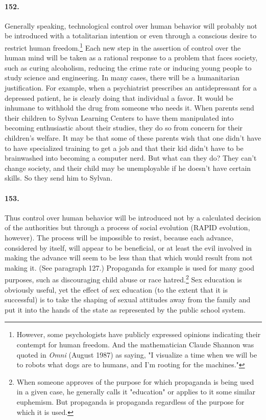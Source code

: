 \documentclass[12pt]{book}
\begin{document}
\paragraph{152.} Generally speaking, technological control over human behavior will probably not be introduced with a totalitarian intention or even through a conscious desire to restrict human freedom.\footnote{However, some psychologists have publicly expressed opinions indicating their contempt for human freedom. And the mathematician Claude Shannon was quoted in \emph{Omni} (August 1987) as saying, "I visualize a time when we will be to robots what dogs are to humans, and I'm rooting for the machines."} Each new step in the assertion of control over the human mind will be taken as a rational response to a problem that faces society, such as curing alcoholism, reducing the crime rate or inducing young people to study science and engineering. In many cases, there will be a humanitarian justification. For example, when a psychiatrist prescribes an antidepressant for a depressed patient, he is clearly doing that individual a favor. It would be inhumane to withhold the drug from someone who needs it. When parents send their children to Sylvan Learning Centers to have them manipulated into becoming enthusiastic about their studies, they do so from concern for their children's welfare. It may be that some of these parents wish that one didn't have to have specialized training to get a job and that their kid didn't have to be brainwashed into becoming a computer nerd. But what can they do? They can't change society, and their child may be unemployable if he doesn't have certain skills. So they send him to Sylvan.


\paragraph{153.} Thus control over human behavior will be introduced not by a calculated decision of the authorities but through a process of social evolution (RAPID evolution, however). The process will be impossible to resist, because each advance, considered by itself, will appear to be beneficial, or at least the evil involved in making the advance will seem to be less than that which would result from not making it. (See paragraph 127.) Propaganda for example is used for many good purposes, such as discouraging child abuse or race hatred.\footnote{When someone approves of the purpose for which propaganda is being used in a given case, he generally calls it "education" or applies to it some similar euphemism. But propaganda is propaganda regardless of the purpose for which it is used.} Sex education is obviously useful, yet the effect of sex education (to the extent that it is successful) is to take the shaping of sexual attitudes away from the family and put it into the hands of the state as represented by the public school system.
\end{document}
